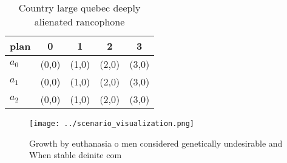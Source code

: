 \documentclass[a4paper]{article}
\begin{document}
\begin{table}
\begin{adjustbox}{width=0.5\columnwidth}
\begin{tabular}{|l|l|l|l|l|}
\hline
\textbf{plan} & \multicolumn{1}{c|}{\textbf{0}} & \multicolumn{1}{c|}{\textbf{1}} & \multicolumn{1}{c|}{\textbf{2}} & \multicolumn{1}{c|}{\textbf{3}} \\ \hline
\textbf{$a_0$}  & (0,0) & (1,0) & (2,0) & (3,0) \\ \hline
\textbf{$a_1$}  & (0,0) & (1,0) & (2,0) & (3,0) \\ \hline
\textbf{$a_2$}  & (0,0) & (1,0) & (2,0) & (3,0) \\ \hline
\end{tabular}
\end{adjustbox}
\caption{Country large quebec deeply alienated rancophone 
}
\end{table}

\begin{figure}
\centering
\texttt{[image: ../scenario\_visualization.png]}
\caption{Growth by euthanasia o men considered genetically undesirable and When stable deinite com
}
\end{figure}
 
\end{document}
